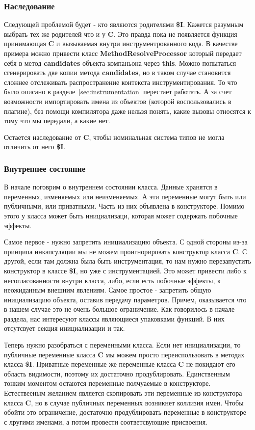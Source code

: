 \subsubsection{Наследование}

Следующей проблемой будет - кто являются родителями \textbf{\$I}.
Кажется разумным выбрать тех же родителей что и у \textbf{C}.
Это правда пока не появляется функция принимающая \textbf{C} и вызываемая
внутри инструментрованного кода.
В качестве примера можно привести класс \textbf{MethodResolveProcessor}
который передает себя в метод \textbf{candidates} объекта-компаньона
через \textbf{this}.
Можно попытаться сгенерировать две копии метода \textbf{candidates},
но в таком случае становится сложнее отслеживать распространение контекста
инструментирования.
То что было описано в разделе~\ref{sec:instrumentation} перестает работать.
А за счет возможности импортировать имена из объектов (которой воспользовались
в плагине), без помощи компилятора даже нельзя понять, какие вызовы относятся
к тому что мы передали, а какие нет.

Остается наследование от \textbf{C}, чтобы номинальная система типов не могла
отличить от него \textbf{\$I}.

\subsubsection{Внутреннее состояние}

В начале поговрим о внутреннем состоянии класса.
Данные хранятся в переменных, изменяемых или неизменяемых.
А эти переменные могут быть или публичными, или приватными.
Часть из них объявлена в конструкторе.
Помимо этого у класса может быть инициализаци, которая может содержать побочные
эффекты.

Самое первое - нужно запретить инициализацию объекта.
С одной стороны из-за принципа инкапсуляции мы не можем проигнорировать
конструктор класса \textbf{C}.
С другой, если там должна была быть инструментация, то нам нужно перезапустить
конструктор в классе \textbf{\$I}, но уже с инструментацией.
Это может привести либо к несогласованности внутри класса, либо, если есть
побочные эффекты, к неожиданным внешним явлениям.
Самое простое - запретить общую инициализацию объекта, оставив передачу параметров.
Причем, оказывается что в нашем случае это не очень большое ограничение.
Как говорилось в начале раздела, нас интересуют классы являющиеся упаковками
функций.
В них отсутсвует секция инициализации и так.

Теперь нужно разобраться с переменными класса.
Если нет инициализации, то публичные переменные класса \textbf{C} мы можем
просто переиспользовать в методах класса \textbf{\$I}.
Приватные переменные же переменные класса \textbf{C} не покидают его область
видимости, поэтому их достаточно продублировать.
Единственным тонким моментом остаются переменные полчуаемые в конструкторе.
Естествееным желанием является скопировать эти переменные из конструктора
класса \textbf{C}, но в случае публичных переменных возникнет коллизия имен.
Чтобы обойти это ограничение, достаточно продублировать переменные в конструкторе
с лругими именами, а потом провести соответсвующие присвоения.

